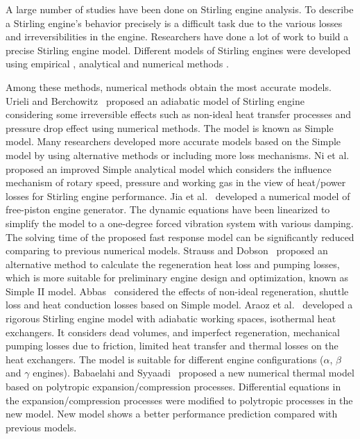 \documentclass[review,3p,10t]{elsarticle}
\begin{document}
A large number of studies have been done on Stirling engine analysis. To describe a Stirling engine's behavior precisely is a difficult task due to the various losses and irreversibilities in the engine.
Researchers have done a lot of work to build a precise Stirling engine model. Different models of Stirling engines were developed using empirical%
, analytical
 and numerical methods
 .

Among these methods, numerical methods obtain the most accurate models. Urieli and Berchowitz~\cite{Urieli1984} proposed an adiabatic model of Stirling engine considering some irreversible effects such as non-ideal heat transfer processes and pressure drop effect using numerical methods. The model is known as Simple model. Many researchers developed more accurate models based on the Simple model by using alternative methods or including more loss mechanisms. 
Ni et al.~\cite{Ni2016} proposed an improved Simple analytical model which considers the influence mechanism of rotary speed, pressure and working gas in the view of heat/power losses for Stirling engine performance.
Jia et al.~\cite{Jia2016} developed a numerical model of free-piston engine generator. The dynamic equations have been linearized to simplify the model to a one-degree forced vibration system with various damping. The solving time of the proposed fast response model can be significantly reduced comparing to previous numerical models.
Strauss and Dobson~\cite{Strauss2010} proposed an alternative method to calculate the regeneration heat loss and pumping losses, which is more suitable for preliminary engine design and optimization, known as Simple II model.
Abbas~\cite{Abbas2014} considered the effects of non-ideal regeneration, shuttle loss and heat conduction losses based on Simple model. 
Araoz et al.~\cite{Araoz2015} developed a rigorous Stirling engine model with adiabatic working spaces, isothermal heat exchangers. It considers dead volumes, and imperfect regeneration, mechanical pumping losses due to friction, limited heat transfer and thermal losses on the heat exchangers. The model is suitable for different engine configurations ($\alpha$, $\beta$ and $\gamma$ engines).
Babaelahi and Syyaadi~\cite{Babaelahi2015} proposed a new numerical thermal model based on polytropic expansion/compression processes. Differential equations in the expansion/compression processes were modified to polytropic processes in the new model. New model shows a better performance prediction compared with previous models.
\end{document}
